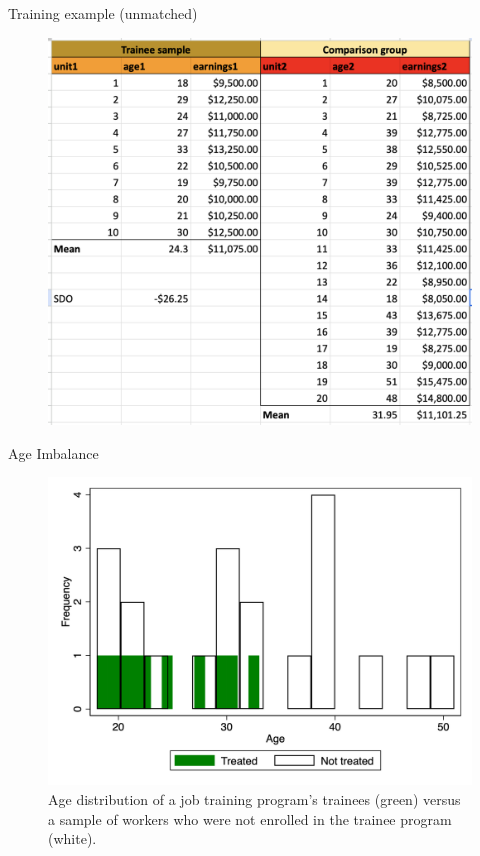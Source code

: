 \documentclass{beamer}
\begin{document}
\begin{frame}{Training example (unmatched)}

\begin{figure}[!t]\centering
\includegraphics[scale=0.35]{./lecture_includes/raw_example}
\end{figure}


\end{frame}


\begin{frame}{Age Imbalance}

\begin{figure}[!t]\centering
\caption{Age distribution of a job training program's trainees (green) versus a sample of workers who were not enrolled in the trainee program (white).}
\includegraphics[scale=0.20]{./lecture_includes/age_match.png}
\end{figure}

\end{frame}
\end{document}
